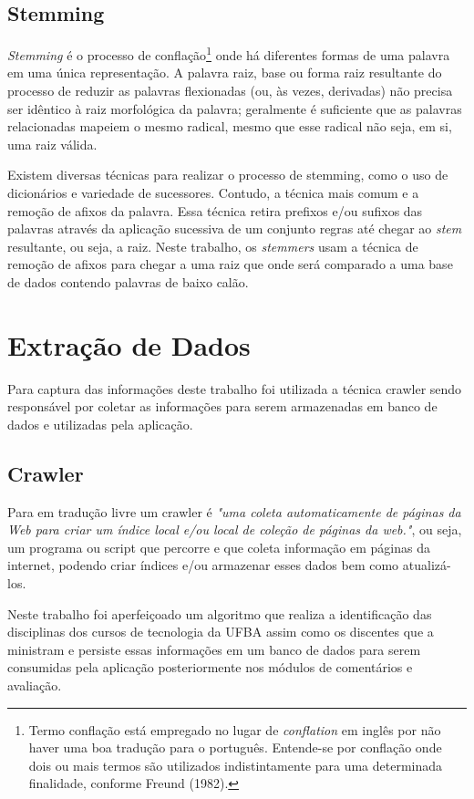 \documentclass[12pt, a4paper]{report}
\begin{document}
\subsection{Stemming}
 \emph{Stemming} é o processo de conflação\footnote{Termo conflação está empregado no lugar de \emph{conflation} em inglês por não haver uma boa tradução para o português. Entende-se por conflação onde dois ou mais termos são utilizados indistintamente para uma determinada finalidade, conforme Freund (1982).} onde há diferentes formas de uma palavra em uma única representação.
A palavra raiz, base ou forma raiz resultante do processo de reduzir as palavras flexionadas (ou, às vezes, derivadas) não precisa ser idêntico à raiz morfológica da palavra; geralmente é suficiente que as palavras relacionadas mapeiem o mesmo radical, mesmo que esse radical não seja, em si, uma raiz válida.

Existem diversas técnicas para realizar o processo de stemming, como o uso de dicionários e variedade de sucessores. Contudo, a técnica mais comum e a remoção de afixos da palavra. Essa técnica retira prefixos e/ou sufixos das palavras através da aplicação sucessiva de um conjunto regras até chegar ao \emph{stem} resultante, ou seja, a raiz. Neste trabalho, os \emph{stemmers} usam a técnica de remoção de afixos para chegar a uma raiz que onde será comparado a uma base de dados contendo palavras de baixo calão.   

\section{Extração de Dados}
Para captura das informações deste trabalho foi utilizada a técnica crawler sendo responsável por coletar as informações para serem armazenadas em banco de dados e utilizadas pela aplicação.

\subsection{Crawler}
Para \cite[p. 1]{ilprints376} em tradução livre um crawler é \textit{"uma coleta automaticamente de páginas da Web para criar um índice local e/ou local de coleção de páginas da web."}, ou seja, um programa ou script que percorre e que coleta informação em páginas da internet, podendo criar índices e/ou armazenar esses dados bem como atualizá-los. 

Neste trabalho foi aperfeiçoado um algoritmo que realiza  a identificação das disciplinas dos cursos de tecnologia da UFBA assim como os discentes que a ministram e persiste essas informações em um banco de dados para serem consumidas pela aplicação posteriormente nos módulos de comentários e avaliação.
\end{document}
